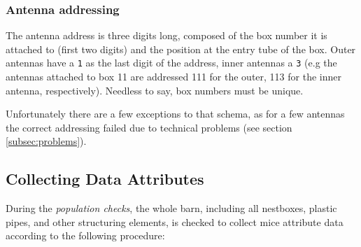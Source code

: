 \subsubsection{Antenna addressing}
\label{subsubsec:addressing}

The antenna address is three digits long, composed of the box number it is attached to (first two digits) and the position at the entry tube of the box. Outer antennas have a \lstinline|1| as the last digit of the address, inner antennas a \lstinline|3| (e.g the antennas attached to box 11 are addressed 111 for the outer, 113 for the inner antenna, respectively). Needless to say, box numbers must be unique.

Unfortunately there are a few exceptions to that schema, as for a few antennas the correct addressing failed due to technical problems (see section \ref{subsec:problems}).

% 

\subsection{Collecting Data Attributes}
\label{subsec:dataattr}

During the \textit{population checks}, the whole barn, including all nestboxes, plastic pipes, and other structuring elements, is checked to collect mice attribute data according to the following procedure:

